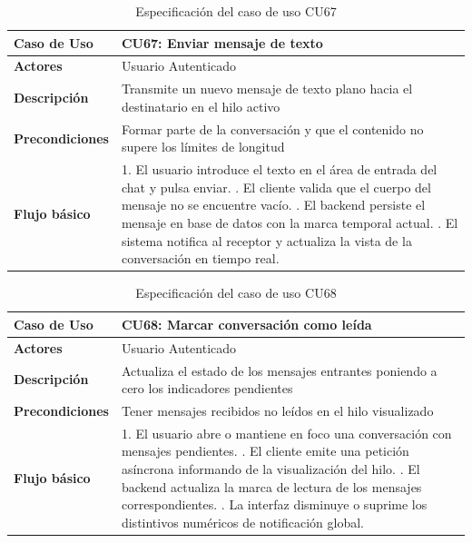 \begin{table}[H]
\centering
\begin{tabular}{|p{3.2cm}|p{11.3cm}|}
\hline
\textbf{Caso de Uso} & \textbf{CU67: Enviar mensaje de texto} \\ \hline
\textbf{Actores} & Usuario Autenticado \\ \hline
\textbf{Descripción} & Transmite un nuevo mensaje de texto plano hacia el destinatario en el hilo activo \\ \hline
\textbf{Precondiciones} & Formar parte de la conversación y que el contenido no supere los límites de longitud \\ \hline
\textbf{Flujo básico} & 
1. El usuario introduce el texto en el área de entrada del chat y pulsa enviar. \newline
2. El cliente valida que el cuerpo del mensaje no se encuentre vacío. \newline
3. El backend persiste el mensaje en base de datos con la marca temporal actual. \newline
4. El sistema notifica al receptor y actualiza la vista de la conversación en tiempo real. \\ \hline
\end{tabular}
\caption{Especificación del caso de uso CU67}
\label{tab:cu67}
\end{table}

\begin{table}[H]
\centering
\begin{tabular}{|p{3.2cm}|p{11.3cm}|}
\hline
\textbf{Caso de Uso} & \textbf{CU68: Marcar conversación como leída} \\ \hline
\textbf{Actores} & Usuario Autenticado \\ \hline
\textbf{Descripción} & Actualiza el estado de los mensajes entrantes poniendo a cero los indicadores pendientes \\ \hline
\textbf{Precondiciones} & Tener mensajes recibidos no leídos en el hilo visualizado \\ \hline
\textbf{Flujo básico} & 
1. El usuario abre o mantiene en foco una conversación con mensajes pendientes. \newline
2. El cliente emite una petición asíncrona informando de la visualización del hilo. \newline
3. El backend actualiza la marca de lectura de los mensajes correspondientes. \newline
4. La interfaz disminuye o suprime los distintivos numéricos de notificación global. \\ \hline
\end{tabular}
\caption{Especificación del caso de uso CU68}
\label{tab:cu68}
\end{table}